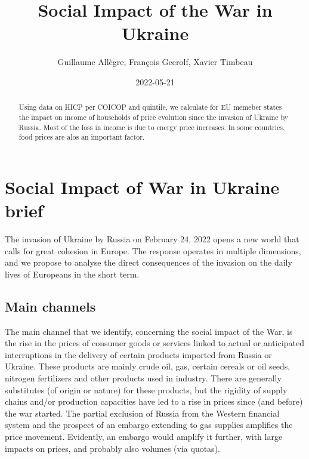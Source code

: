\documentclass[
  9pt,
  a4paper,
  DIV=11,
  numbers=noendperiod]{scrartcl}
\title{Social Impact of the War in Ukraine}
\author{Guillaume Allègre, François Geerolf, Xavier Timbeau}
\date{2022-05-21}
\renewcommand*\contentsname{Table of contents}
\newcommand\contentsname{Table of contents}
\begin{document}
\maketitle
\begin{abstract}
Using data on HICP per COICOP and quintile, we calculate for EU memeber
states the impact on income of households of price evolution since the
invasion of Ukraine by Russia. Most of the loss in income is due to
energy price increases. In some countries, food prices are alos an
important factor.
\end{abstract}
\ifdefined\Shaded\renewenvironment{Shaded}{\begin{tcolorbox}[enhanced, sharp corners, borderline west={3pt}{0pt}{shadecolor}, breakable, frame hidden, interior hidden, boxrule=0pt]}{\end{tcolorbox}}\fi

\renewcommand*\contentsname{Table of contents}
{
\hypersetup{linkcolor=}
\setcounter{tocdepth}{2}
\tableofcontents
}
\hypertarget{social-impact-of-war-in-ukraine-brief}{%
\section{Social Impact of War in Ukraine
brief}\label{social-impact-of-war-in-ukraine-brief}}

The invasion of Ukraine by Russia on February 24, 2022 opens a new world
that calls for great cohesion in Europe. The response operates in
multiple dimensions, and we propose to analyse the direct consequences
of the invasion on the daily lives of Europeans in the short term.

\hypertarget{main-channels}{%
\subsection{Main channels}\label{main-channels}}

The main channel that we identify, concerning the social impact of the
War, is the rise in the prices of consumer goods or services linked to
actual or anticipated interruptions in the delivery of certain products
imported from Russia or Ukraine. These products are mainly crude oil,
gas, certain cereals or oil seeds, nitrogen fertilizers and other
products used in industry. There are generally substitutes (of origin or
nature) for these products, but the rigidity of supply chains and/or
production capacities have led to a rise in prices since (and before)
the war started. The partial exclusion of Russia from the Western
financial system and the prospect of an embargo extending to gas
supplies amplifies the price movement. Evidently, an embargo would
amplify it further, with large impacts on prices, and probably also
volumes (via quotas).
\end{document}
